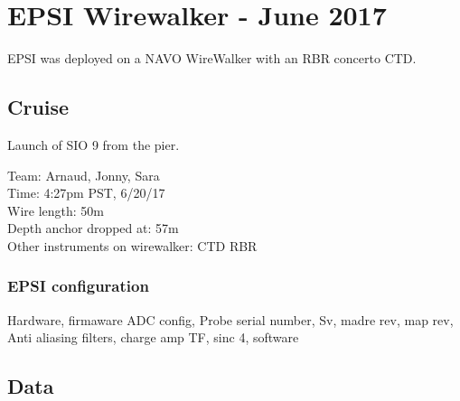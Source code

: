 \chapter{EPSI Wirewalker - June 2017}

EPSI was deployed on a NAVO WireWalker with an RBR concerto CTD. 


\section{Cruise}
Launch of SIO 9 from the pier. 

Team: Arnaud, Jonny, Sara \\
Time: 4:27pm PST, 6/20/17 \\
Wire length: 50m          \\
Depth anchor dropped at: 57m \\
Other instruments on wirewalker: CTD RBR\\


\subsection{EPSI configuration}
Hardware, firmaware
ADC config, Probe serial number, Sv, madre rev, map rev, Anti aliasing filters, charge amp TF, sinc 4, software


\section{Data}

